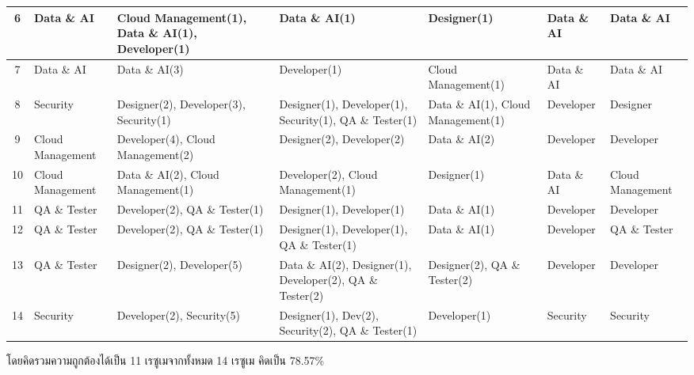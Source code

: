 \begin{table}[H]
\begin{tabularx}{\textwidth}{|c|X|X|X|X|X|X|}
        6                     & Data \& AI                     & Cloud Management(1), Data \& AI(1), Developer(1) & Data \& AI(1)                                             & Designer(1)                        & Data \& AI                       & Data \& AI                             \\ \hline
        7                     & Data \& AI                     & Data \& AI(3)                                    & Developer(1)                                              & Cloud Management(1)                & Data \& AI                       & Data \& AI                             \\ \hline
        8                     & Security                       & Designer(2), Developer(3), Security(1)           & Designer(1), Developer(1), Security(1), QA \& Tester(1)   & Data \& AI(1), Cloud Management(1) & {\cellcolor[gray]{.9}}Developer  & {\cellcolor[gray]{.9}}Designer         \\ \hline
        9                     & Cloud Management               & Developer(4), Cloud Management(2)                & Designer(2), Developer(2)                                 & Data \& AI(2)                      & Developer                        & Developer                              \\ \hline
        10                    & Cloud Management               & Data \& AI(2), Cloud Management(1)               & Developer(2), Cloud Management(1)                         & Designer(1)                        & {\cellcolor[gray]{.9}}Data \& AI & {\cellcolor[gray]{.9}}Cloud Management \\ \hline
        11                    & QA \& Tester                   & Developer(2), QA \& Tester(1)                    & Designer(1), Developer(1)                                 & Data \& AI(1)                      & Developer                        & Developer                              \\ \hline
        12                    & QA \& Tester                   & Developer(2), QA \& Tester(1)                    & Designer(1), Developer(1), QA \& Tester(1)                & Data \& AI(1)                      & {\cellcolor[gray]{.9}}Developer  & {\cellcolor[gray]{.9}}QA \& Tester     \\ \hline
        13                    & QA \& Tester                   & Designer(2), Developer(5)                        & Data \& AI(2), Designer(1), Developer(2), QA \& Tester(2) & Designer(2), QA \& Tester(2)       & Developer                        & Developer                              \\ \hline
        14                    & Security                       & Developer(2), Security(5)                        & Designer(1), Dev(2), Security(2), QA \& Tester(1)         & Developer(1)                       & Security                         & Security                               \\ \hline
    \end{tabularx}
\end{table}
โดยคิดรวมความถูกต้องได้เป็น 11 เรซูเมจากทั้งหมด 14 เรซูเม คิดเป็น 78.57\%